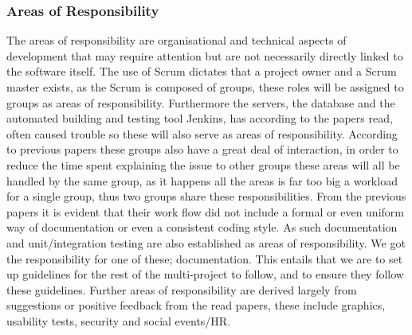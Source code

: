 \subsubsection*{Areas of Responsibility}
The areas of responsibility are organisational and technical aspects of development that may require attention but are not necessarily directly linked to the software itself.
The use of Scrum dictates that a project owner and a Scrum master exists, as the Scrum is composed of groups, these roles will be assigned to groups as areas of responsibility.
Furthermore the servers, the database and the automated building and testing tool Jenkins, has according to the papers read, often caused trouble so these will also serve as areas of responsibility. 
According to previous papers these groups also have a great deal of interaction, in order to reduce the time spent explaining the issue to other groups these areas will all be handled by the same group, as it happens all the areas is far too big a workload for a single group, thus two groups share these responsibilities.
From the previous papers it is evident that their work flow did not include a formal or even uniform way of documentation or even a consistent coding style.
As such documentation and unit/integration testing are also established as areas of responsibility.
We got the responsibility for one of these; documentation. 
This entails that we are to set up guidelines for the rest of the multi-project to follow, and to ensure they follow these guidelines.
Further areas of responsibility are derived largely from suggestions or positive feedback from the read papers, these include graphics, usability tests, security and social events/HR.

